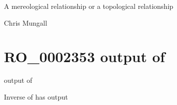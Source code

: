 \documentclass[letterpaper,10pt,english]{sphinxmanual}
\begin{document}
\begin{sphinxShadowBox}

\sphinxAtStartPar
A mereological relationship or a topological relationship
\end{sphinxShadowBox}

\begin{sphinxShadowBox}

\sphinxAtStartPar
{}
\end{sphinxShadowBox}

\begin{sphinxShadowBox}

\sphinxAtStartPar
Chris Mungall
\end{sphinxShadowBox}
\begin{quote}
\label{\detokenize{doc-RO_0002353:ro-0002353}}\label{\detokenize{doc-RO_0002353:output-of}}\label{\detokenize{doc-RO_0002353:ro-0002353}}
\ignorespaces \end{quote}


\section{RO\_0002353 \sphinxhyphen{} output of}
\label{\detokenize{doc-RO_0002353:ro-0002353-output-of}}\label{\detokenize{doc-RO_0002353:index-0}}\label{\detokenize{doc-RO_0002353::doc}}
\begin{sphinxShadowBox}

\sphinxAtStartPar
output of
\end{sphinxShadowBox}

\begin{sphinxShadowBox}

\sphinxAtStartPar
Inverse of has output
\end{sphinxShadowBox}

\begin{sphinxShadowBox}

\sphinxAtStartPar
{}
\end{sphinxShadowBox}
\end{document}

